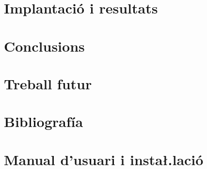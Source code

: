 \documentclass[11pt,a4paper,twoside]{report}
\begin{document}
  \chapter{Implantació i resultats}
   
   

  \chapter{Conclusions}
  \chapter{Treball futur}

  \nocite{*}
  \chapter{Bibliografía}
  \printbibliography[heading=none]
  \chapter{Manual d'usuari i insta\l.lació}
  
  
  
\end{document}
